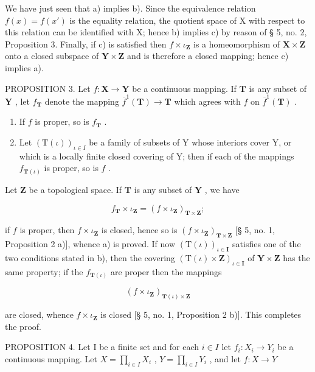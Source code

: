 We have just seen that a) implies b). Since the equivalence relation \(f(x) = f(x')\) is the equality relation, the quotient space of X with respect to this relation can be identified with X; hence b) implies c) by reason of § 5, no. 2, Proposition 3. Finally, if c) is satisfied then \(f \times \iota_{\mathbf{Z}}\) is a homeomorphism of \(\mathbf{X} \times \mathbf{Z}\) onto a closed subspace of \(\mathbf{Y} \times \mathbf{Z}\) and is therefore a closed mapping; hence c) implies a).

PROPOSITION 3. Let \(f: \mathbf{X} \to \mathbf{Y}\) be a continuous mapping. If \(\mathbf{T}\) is any subset of \(\mathbf{Y}\) , let \(f_{\mathbf{T}}\) denote the mapping \(\overline{f}^{1}(\mathbf{T}) \to \mathbf{T}\) which agrees with \(f\) on \(\overline{f}^{1}(\mathbf{T})\) .

\begin{enumerate}
\def\labelenumi{\alph{enumi})}
\item
  If \(f\) is proper, so is \(f_{\mathbf{T}}\) .
\item
  Let \((\mathrm{T}(\iota))_{\iota\in I}\) be a family of subsets of Y whose interiors cover Y, or which is a locally finite closed covering of Y; then if each of the mappings \(f_{\mathbf{T}(\iota)}\) is proper, so is \(f\) .
\end{enumerate}

Let \(\mathbf{Z}\) be a topological space. If \(\mathbf{T}\) is any subset of \(\mathbf{Y}\) , we have

\[
f _ {\mathbf {T}} \times \iota_ {\mathbf {Z}} = (f \times \iota_ {\mathbf {Z}}) _ {\mathbf {T} \times \mathbf {Z}};
\]

if \(f\) is proper, then \(f \times \iota_{\mathbf{Z}}\) is closed, hence so is \((f \times \iota_{\mathbf{Z}})_{\mathbf{T} \times \mathbf{Z}}\) {[}§ 5, no. 1, Proposition 2 a){]}, whence a) is proved. If now \((\mathrm{T}(\iota))_{\iota \in \mathbf{I}}\) satisfies one of the two conditions stated in b), then the covering \((\mathrm{T}(\iota) \times \mathbf{Z})_{\iota \in \mathbf{I}}\) of \(\mathbf{Y} \times \mathbf{Z}\) has the same property; if the \(f_{\mathbf{T}(\iota)}\) are proper then the mappings

\[
(f \times \iota_ {\mathbf {Z}}) _ {\mathbf {T} (\iota) \times \mathbf {Z}}
\]

are closed, whence \(f \times \iota_{\mathbf{Z}}\) is closed {[}§ 5, no. 1, Proposition 2 b){]}. This completes the proof.

PROPOSITION 4. Let I be a finite set and for each \(i \in I\) let \(f_i: X_i \to Y_i\) be a continuous mapping. Let \(X = \prod_{i \in I} X_i\) , \(Y = \prod_{i \in I} Y_i\) , and let \(f: X \to Y\)

